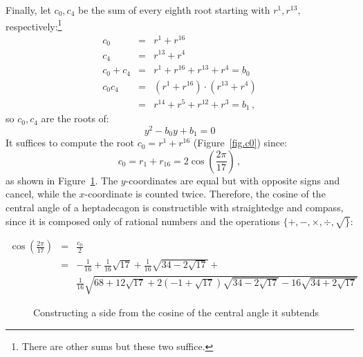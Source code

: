 \documentclass[11pt,a4paper]{article}
\newenvironment{form}[1]{%
\begin{displaymath}%
\renewcommand{\arraystretch}{#1}%
\begin{array}{lcl}}%
{\end{array}%
\end{displaymath}%
}
\newcommand*{\disfrac}[2]{\displaystyle\frac{#1}{#2}}
\begin{document}
Finally, let $c_0,c_4$ be the sum of every eighth root starting with $r^1,r^{13}$, respectively:\footnote{There are other sums but these two suffice.}
\begin{form}{1.4}
c_0&=&r^1+r^{16}\\
c_4&=&r^{13}+r^4\\
c_0+c_4&=&r^1+r^{16}+r^{13}+r^4=b_0\\
c_0c_4&=&(r^1+r^{16})\cdot(r^{13}+r^4)\\
&=&r^{14}+r^5+r^{12}+r^3=b_1\,,
\end{form}
so $c_0,c_4$ are the roots of:
\[
y^2-b_0y+b_1=0
\]
It suffices to compute the root $c_0=r^1+r^{16}$
(Figure~\ref{fig.c0}) since:
\[
c_0=r_1+r_{16}=2\cos\left(\frac{2\pi}{17}\right)\,,
\]
as shown in Figure~\ref{fig.two-cosine}. The $y$-coordinates are equal but with opposite signs and cancel, while the $x$-coordinate is counted twice.
Therefore, the cosine of the central angle of a heptadecagon is constructible with straightedge and compass, since it is composed only of rational numbers and the operations $\{+,-,\times,\div,\surd\}$:

\begin{form}{2.2}
\cos\left(\disfrac{2\pi}{17}\right) &=& 
\disfrac{c_0}{2}\\
&=&
-\disfrac{1}{16}+\disfrac{1}{16}\sqrt{17} + 
     \disfrac{1}{16}\sqrt{34-2\sqrt{17}}
    + \\
    &&
     \disfrac{1}{16}\sqrt{
     68+12\sqrt{17} + 
     2(-1+\sqrt{17})\sqrt{34-2\sqrt{17}}
   -16
     \sqrt{34+2\sqrt{17}}
   }
\end{form}

\begin{figure}
\begin{center}
\caption{Constructing a side from the cosine of the central angle it subtends}\label{fig.two-cosine}
\end{center}
\end{figure}
\end{document}
